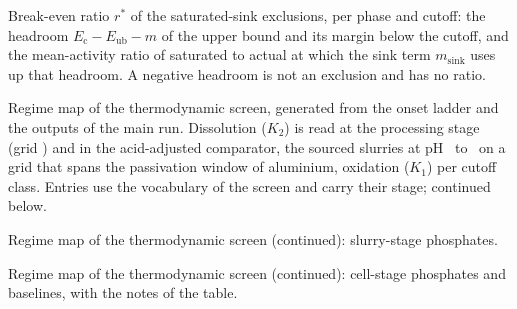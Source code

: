 \begin{table}[t]
\caption{Break-even ratio $r^*$ of the saturated-sink exclusions\nacreSinkMark, per phase and cutoff: the headroom $E_\mathrm{c}-E_\mathrm{ub}-m$ of the upper bound and its margin below the cutoff, and the mean-activity ratio of saturated to actual  at which the sink term $m_\mathrm{sink}$ uses up that headroom. A negative headroom is not an exclusion and has no ratio.}
\label{tab:breakeven}
\nacreBreakevenTable
\end{table}


\begin{table}[tp]
\caption{Regime map of the thermodynamic screen, generated from the onset ladder and the outputs of the main run. Dissolution ($K_2$) is read at the processing stage (grid \NumRegGridId) and in the acid-adjusted comparator, the sourced slurries at pH \NumAcidSourcedLo\ to \NumAcidSourcedHi\ on a grid that spans the passivation window of aluminium, oxidation ($K_1$) per cutoff class. Entries use the vocabulary of the screen and carry their stage; continued below.}\label{tab:regime}
\nacreRegimeTablePartA
\end{table}
\begin{table}[tp]
\ContinuedFloat
\caption{Regime map of the thermodynamic screen (continued): slurry-stage phosphates.}
\nacreRegimeTablePartB
\end{table}
\begin{table}[tp]
\ContinuedFloat
\caption{Regime map of the thermodynamic screen (continued): cell-stage phosphates and baselines, with the notes of the table.}
\nacreRegimeTablePartC
\end{table}

